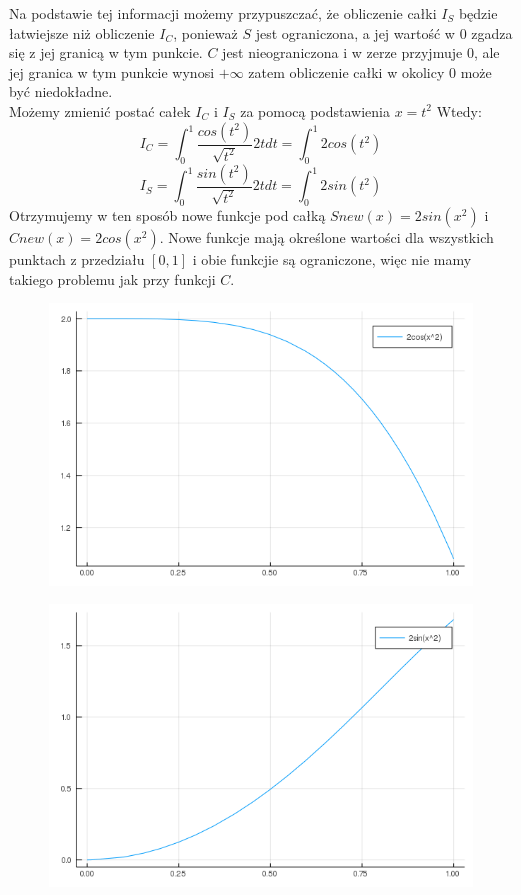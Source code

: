 \documentclass{article}
\begin{document}
Na podstawie tej informacji możemy przypuszczać, że obliczenie całki $I_S$ będzie łatwiejsze niż obliczenie $I_C$, ponieważ $S$ jest ograniczona, a jej wartość w $0$ zgadza się z jej granicą w tym punkcie. $C$ jest nieograniczona i w zerze przyjmuje $0$, ale jej granica w tym punkcie wynosi $+\infty$ zatem obliczenie całki w okolicy $0$ może być niedokładne.\\
Możemy zmienić postać całek $I_C$ i $I_S$ za pomocą podstawienia $x=t^2$ Wtedy:
\begin{equation}
I_C = \int_0^1 \frac{cos(t^2)}{\sqrt{t^2}} 2tdt = \int_0^1 2cos(t^2)
\end{equation}
\begin{equation}
I_S = \int_0^1 \frac{sin(t^2)}{\sqrt{t^2}} 2tdt = \int_0^1 2sin(t^2)
\end{equation}
Otrzymujemy w ten sposób nowe funkcje pod całką $Snew(x) = 2sin(x^2)$ i $Cnew(x) = 2cos(x^2)$. Nowe funkcje mają określone wartości dla wszystkich punktach z przedziału $[0,1]$ i obie funkcjie są ograniczone, więc nie mamy takiego problemu jak przy funkcji $C$.
\begin{figure}[ht]
    \includegraphics[scale=0.5]{WykresCnew.png}
    \label{wykresCnew}
\end{figure}
\begin{figure}[ht]
    \includegraphics[scale=0.5]{WykresSnew.png}
    \label{WykresSnew}
\end{figure}
\end{document}
